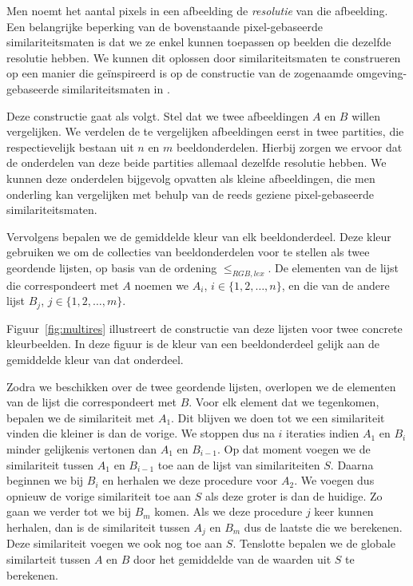 Men noemt het aantal pixels in een afbeelding de \emph{resolutie} van die afbeelding.
Een belangrijke beperking van de bovenstaande pixel-gebaseerde similariteitsmaten is dat we
ze enkel kunnen toepassen op beelden die dezelfde resolutie hebben. We kunnen dit oplossen
door similariteitsmaten te construeren op een manier die ge\"inspireerd is op de constructie
van de zogenaamde omgeving-gebaseerde similariteitsmaten in \cite{vanderweken:similariteitsmaten}. 

Deze constructie gaat als volgt. Stel dat we twee afbeeldingen $A$ en $B$ willen
vergelijken. We verdelen
de te vergelijken afbeeldingen eerst in twee partities, die respectievelijk bestaan uit
$n$ en $m$ beeldonderdelen. Hierbij zorgen we ervoor dat de onderdelen
van deze beide partities allemaal dezelfde resolutie hebben. We kunnen deze onderdelen bijgevolg 
opvatten als kleine afbeeldingen, die men onderling kan vergelijken met behulp van de reeds 
geziene pixel-gebaseerde similariteitsmaten.

Vervolgens bepalen we de gemiddelde kleur van elk beeldonderdeel. Deze kleur gebruiken we om
de collecties van beeldonderdelen voor te stellen als twee geordende lijsten, op basis
van de ordening $\leq_{RGB,lex}$. De elementen van de lijst die correspondeert met $A$ noemen 
we $A_i$, $i \in \{1,2,\ldots,n\}$, en die van de andere lijst $B_j$, $j \in \{1,2,\ldots,m\}$.

Figuur~\ref{fig:multires} illustreert de constructie van deze lijsten voor twee concrete
kleurbeelden. In deze figuur is de kleur van een beeldonderdeel gelijk aan de gemiddelde 
kleur van dat onderdeel.

Zodra we beschikken over de twee geordende lijsten, overlopen we de elementen van de 
lijst die correspondeert met $B$. Voor
elk element dat we tegenkomen, bepalen we de similariteit met $A_1$. Dit blijven we doen
tot we een similariteit vinden die kleiner is dan de vorige. We stoppen dus na $i$ iteraties 
indien $A_1$ en $B_i$ minder gelijkenis vertonen dan $A_1$ en $B_{i-1}$. Op dat moment voegen
we de similariteit tussen $A_1$ en $B_{i-1}$ toe aan de lijst van similariteiten $S$. Daarna
beginnen we bij $B_i$ en herhalen we deze procedure voor $A_2$. We voegen dus opnieuw de vorige
similariteit toe aan $S$ als deze groter is dan de huidige. Zo gaan we verder tot we bij
$B_m$ komen. Als we deze procedure $j$ keer kunnen herhalen, dan
is de similariteit tussen $A_j$ en $B_m$ dus de laatste die we berekenen. Deze similariteit
voegen we ook nog toe aan $S$. Tenslotte bepalen we de globale similarteit tussen $A$ en $B$ 
door het gemiddelde van de waarden uit $S$ te berekenen.

